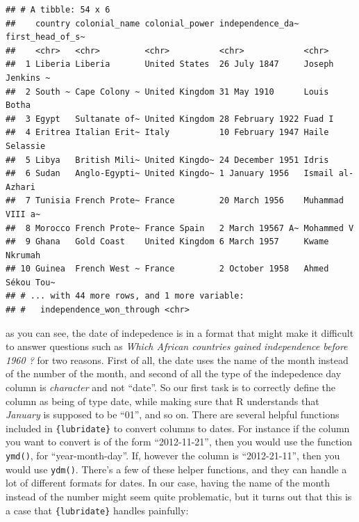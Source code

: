 \documentclass[]{gitbook}
\newenvironment{Shaded}{\begin{snugshade}}{\end{snugshade}}
\newcommand{\DataTypeTok}[1]{\textcolor[rgb]{0.13,0.29,0.53}{#1}}
\newcommand{\KeywordTok}[1]{\textcolor[rgb]{0.13,0.29,0.53}{\textbf{#1}}}
\newcommand{\NormalTok}[1]{#1}
\newcommand{\OperatorTok}[1]{\textcolor[rgb]{0.81,0.36,0.00}{\textbf{#1}}}
\newcommand{\StringTok}[1]{\textcolor[rgb]{0.31,0.60,0.02}{#1}}
\theoremstyle{definition}
\theoremstyle{definition}
\theoremstyle{definition}
\theoremstyle{remark}
\begin{document}
\begin{verbatim}
## # A tibble: 54 x 6
##    country colonial_name colonial_power independence_da~ first_head_of_s~
##    <chr>   <chr>         <chr>          <chr>            <chr>           
##  1 Liberia Liberia       United States  26 July 1847     Joseph Jenkins ~
##  2 South ~ Cape Colony ~ United Kingdom 31 May 1910      Louis Botha     
##  3 Egypt   Sultanate of~ United Kingdom 28 February 1922 Fuad I          
##  4 Eritrea Italian Erit~ Italy          10 February 1947 Haile Selassie  
##  5 Libya   British Mili~ United Kingdo~ 24 December 1951 Idris           
##  6 Sudan   Anglo-Egypti~ United Kingdo~ 1 January 1956   Ismail al-Azhari
##  7 Tunisia French Prote~ France         20 March 1956    Muhammad VIII a~
##  8 Morocco French Prote~ France Spain   2 March 19567 A~ Mohammed V      
##  9 Ghana   Gold Coast    United Kingdom 6 March 1957     Kwame Nkrumah   
## 10 Guinea  French West ~ France         2 October 1958   Ahmed Sékou Tou~
## # ... with 44 more rows, and 1 more variable:
## #   independence_won_through <chr>
\end{verbatim}

as you can see, the date of indepedence is in a format that might make
it difficult to answer questions such as \emph{Which African countries
gained independence before 1960 ?} for two reasons. First of all, the
date uses the name of the month instead of the number of the month, and
second of all the type of the indepedence day column is \emph{character}
and not ``date''. So our first task is to correctly define the column as
being of type date, while making sure that R understands that
\emph{January} is supposed to be ``01'', and so on. There are several
helpful functions included in \texttt{\{lubridate\}} to convert columns
to dates. For instance if the column you want to convert is of the form
``2012-11-21'', then you would use the function \texttt{ymd()}, for
``year-month-day''. If, however the column is ``2012-21-11'', then you
would use \texttt{ydm()}. There's a few of these helper functions, and
they can handle a lot of different formats for dates. In our case,
having the name of the month instead of the number might seem quite
problematic, but it turns out that this is a case that
\texttt{\{lubridate\}} handles painfully:

\begin{Shaded}
\end{Shaded}
\end{document}
